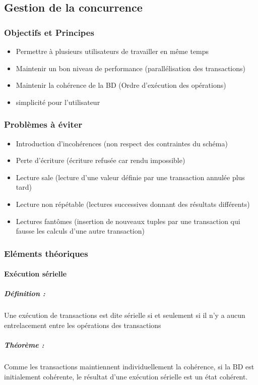 \documentclass[10pt,a4paper,twoside]{article}
\begin{document}
\subsection{Gestion de la concurrence}
\subsubsection{Objectifs et Principes}
\begin{itemize}
\item Permettre à plusieurs utilisateurs de travailler en même temps
\item Maintenir un bon niveau de performance (parallélisation des transactions)
\item Maintenir la cohérence de la BD (Ordre d'exécution des opérations)
\item simplicité pour l'utilisateur
\end{itemize}

\subsubsection{Problèmes à éviter}
\begin{itemize}
\item Introduction d'incohérences (non respect des contraintes du schéma)
\item Perte d'écriture (écriture refusée car rendu impossible)
\item Lecture sale (lecture d'une valeur définie par une transaction annulée plus tard)
\item Lecture non répétable (lectures successives donnant des résultats différents)
\item Lectures fantômes (insertion de nouveaux tuples par une transaction qui fausse les calculs d'une autre transaction)
\end{itemize}

\subsubsection{Eléments théoriques}
\paragraph{Exécution sérielle}
\subparagraph{Définition :} Une exécution de transactions est dite sérielle si et seulement si il n'y a aucun entrelacement entre les opérations des transactions

\subparagraph{Théorème : } Comme les transactions maintiennent individuellement la cohérence, si la BD est initialement cohérente, le résultat d'une exécution sérielle est un état cohérent.
\end{document}
